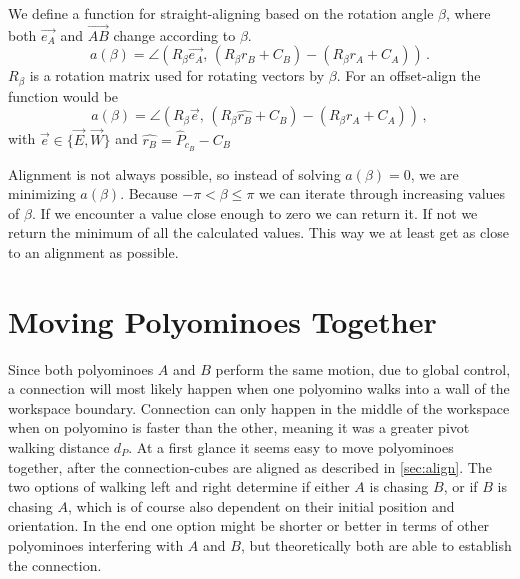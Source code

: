 We define a function for straight-aligning based on the rotation angle $\beta$, where both $\vec{e_A}$ and $\overrightarrow{AB}$ change according to $\beta$.
\begin{equation*}
a(\beta) = \angle \left( R_\beta \vec{e_A}, \, \left( R_\beta r_B + C_B \right) - \left( R_\beta r_A + C_A \right)\right) \,.
\end{equation*}
$R_\beta$ is a rotation matrix used for rotating vectors by $\beta$.
For an offset-align the function would be
\begin{equation*}
a(\beta) = \angle \left( R_\beta \vec{e}, \, \left( R_\beta \hat{r_B} + C_B \right) - \left( R_\beta r_A + C_A \right)\right) \,,
\end{equation*}
with $\vec{e} \in \{ \vec{E}, \vec{W}\}$ and $\hat{r_B} = \hat{P}_{c_B} - C_B$

Alignment is not always possible, so instead of solving $a(\beta) = 0$, we are minimizing $a(\beta)$.
Because $-\pi < \beta \leq \pi$ we can iterate through increasing values of $\beta$.
If we encounter a value close enough to zero we can return it.
If not we return the minimum of all the calculated values.
This way we at least get as close to an alignment as possible.

\section{Moving Polyominoes Together}
\label{sec:walk_wait}

Since both polyominoes $A$ and $B$ perform the same motion, due to global control, a connection will most likely happen when one polyomino walks into a wall of the workspace boundary.
Connection can only happen in the middle of the workspace when on polyomino is faster than the other, meaning it was a greater pivot walking distance $d_P$.
At a first glance it seems easy to move polyominoes together, after the connection-cubes are aligned as described in \autoref{sec:align}.
The two options of walking left and right determine if either $A$ is chasing $B$, or if $B$ is chasing $A$, which is of course also dependent on their initial position and orientation.
In the end one option might be shorter or better in terms of other polyominoes interfering with $A$ and $B$, but theoretically both are able to establish the connection.

